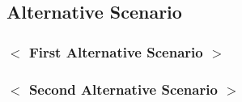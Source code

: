 \documentclass[notitlepage,fullpage]{article}
\begin{document}
\begin{comment}
		\noindent If any information is exchanged, be specific about what is passed back and forth. For example, it is not interesting to say that the client/user enter his/her account data to access his/her bank account. It is better to say the client gives the account's number and the password.

		\noindent A picture is sometimes worth a thousand words, though there is no substitute for clean, clear prose.  If it improves clarity, feel free to paste graphical depictions of user interfaces, process flows or other figures into the use case.  If a flow chart is useful to present a complex decision process, by all means use it!  Similarly for state-dependent behavior, a state-transition diagram often clarifies the behavior of a system better than pages upon pages of text.  Use the right presentation medium for your problem, but be wary of using terminology, notations or figures that your audience may not understand.  Remember that your purpose is to clarify, not obscure.		
	\end{color}
\end{comment}

\subsection{Alternative Scenario}\label{subsec:alternative:scenario}
\subsubsection{$<$ First Alternative Scenario $>$}

\begin{comment}
	\begin{color}{blue}
		\noindent More complex alternatives are described in a separate section, referred to in the Main Scenario  subsection of the Scenarios section.  Think of the Alternative Scenario subsections like alternative behaviors. In this case, each alternative flow represents an alternative behavior usually due to exceptions that occur in the main flow. 

		\noindent An alternative flow may be as long as necessary to describe the events associated with its behavior. When an alternative flow ends, the events of the main flow of events are resumed unless otherwise stated.
	\end{color}
\end{comment}

\subsubsection{$<$ Second Alternative Scenario $>$}
\end{document}
